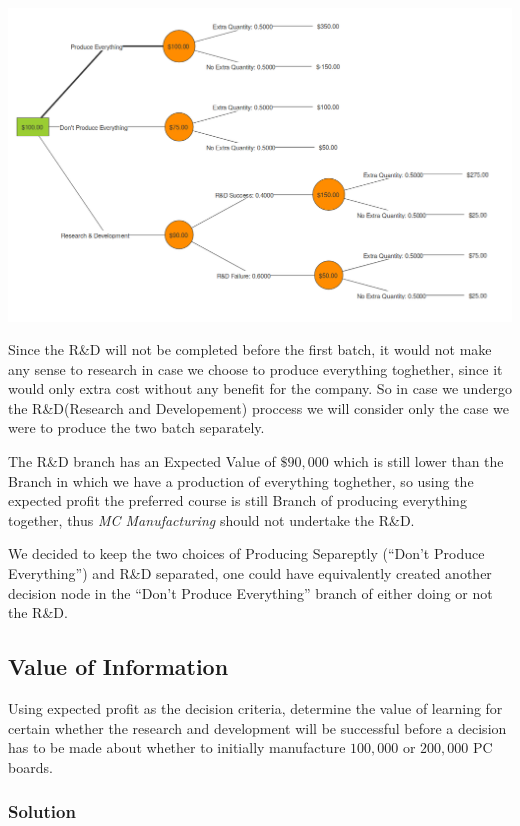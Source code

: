 \documentclass[]{article}
\begin{document}
\includegraphics{Assignment1_files/figure-latex/EX4.png}

Since the R\&D will not be completed before the first batch, it would
not make any sense to research in case we choose to produce everything
toghether, since it would only extra cost without any benefit for the
company. So in case we undergo the R\&D(Research and Developement)
proccess we will consider only the case we were to produce the two batch
separately.

The R\&D branch has an Expected Value of \(\$90,000\) which is still
lower than the Branch in which we have a production of everything
toghether, so using the expected profit the preferred course is still
Branch of producing everything together, thus \emph{MC Manufacturing}
should not undertake the R\&D.

We decided to keep the two choices of Producing Separeptly (``Don't
Produce Everything'') and R\&D separated, one could have equivalently
created another decision node in the ``Don't Produce Everything'' branch
of either doing or not the R\&D.

\subsection{Value of Information}\label{value-of-information}

Using expected profit as the decision criteria, determine the value of
learning for certain whether the research and development will be
successful before a decision has to be made about whether to initially
manufacture \(100,000\) or \(200,000\) PC boards.

\subsubsection{Solution}\label{solution-4}
\end{document}

